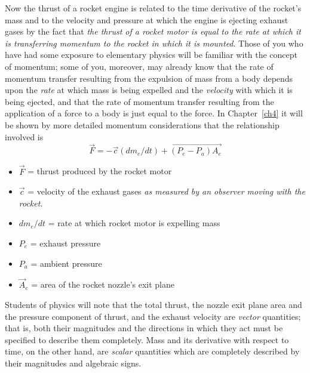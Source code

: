Now the thrust of a rocket engine is related to the time derivative of the rocket's mass and to the velocity
and pressure at which the engine is ejecting exhaust gases by the fact that \emph{the thrust of a rocket
motor is equal to the rate at which it is transferring momentum to the rocket in which it is mounted}. Those
of you who have had some exposure to elementary physics will be familiar with the concept of momentum; some
of you, moreover, may already know that the rate of momentum transfer resulting from the expulsion of mass
from a body depends upon the \emph{rate} at which mass is being expelled and the \emph{velocity} with which
it is being ejected, and that the rate of momentum transfer resulting from the application of a force to a
body is just equal to the force. In Chapter~\ref{ch4} it will be shown by more detailed momentum
considerations that the relationship involved is
\begin{equation*}\tag{1}
\vec{F} = -\vec{c}(dm_e/dt) + \overrightarrow{(P_e - P_a)A_e}
\end{equation*}
\begin{itemize}[nosep,leftmargin=4em,labelwidth=3.5em,labelsep=0.5em,align=left]
  \item[where] $\vec{F}$ = thrust produced by the rocket motor
  \item[] $\vec{c}$ = velocity of the exhaust gases \emph{as measured by an observer moving with the
    rocket}.
  \item[] $dm_e/dt$ = rate at which rocket motor is expelling mass
  \item[] $P_e$ = exhaust pressure
  \item[] $P_a$ = ambient pressure
  \item[] $\vec{A}_e$ = area of the rocket nozzle's exit plane
\end{itemize}
Students of physics will note that the total thrust, the nozzle exit plane area and the pressure component
of thrust, and the exhaust velocity are \emph{vector} quantities; that is, both their magnitudes and the
directions in which they act must be specified to describe them completely. Mass and its derivative with
respect to time, on the other hand, are \emph{scalar} quantities which are completely described by their
magnitudes and algebraic signs.

